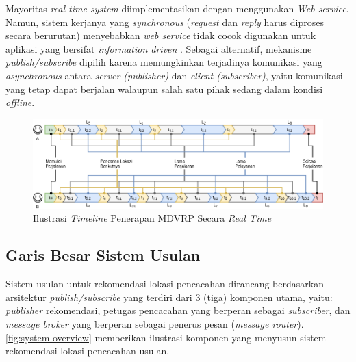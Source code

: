 Mayoritas \textit{real time system} diimplementasikan dengan menggunakan \textit{Web service}. Namun, sistem kerjanya yang \textit{synchronous} (\textit{request} dan \textit{reply} harus diproses secara berurutan) menyebabkan \textit{web service} tidak cocok digunakan untuk aplikasi yang bersifat \textit{information driven} \citep{muhl_large-scale_2002}. Sebagai alternatif, mekanisme \textit{publish/subscribe} dipilih karena memungkinkan terjadinya komunikasi yang \textit{asynchronous} antara \textit{server (publisher)} dan \textit{client (subscriber)}, yaitu komunikasi yang tetap dapat berjalan walaupun salah satu pihak sedang dalam kondisi \textit{offline}.


\begin{figure}[!]
	\centering
	\includegraphics[width=\textwidth]{Resources/Images/illustration-timeline-realtime-mdvrp}
	\captionsetup{format=hang}
	\caption{Ilustrasi \textit{Timeline} Penerapan MDVRP Secara \textit{Real Time}}
	\label{fig:illustration-timeline-realtime-mdvrp}
\end{figure}

\subsection{Garis Besar Sistem Usulan}
Sistem usulan untuk rekomendasi lokasi pencacahan dirancang berdasarkan arsitektur \textit{publish/subscribe} yang terdiri dari 3 (tiga) komponen utama, yaitu: \textit{publisher} rekomendasi, petugas pencacahan yang berperan sebagai \textit{subscriber}, dan \textit{message broker} yang berperan sebagai penerus pesan (\textit{message router}). \autoref{fig:system-overview} memberikan ilustrasi komponen yang menyusun sistem rekomendasi lokasi pencacahan usulan.


